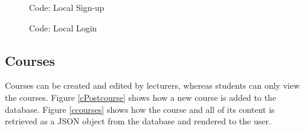 \documentclass[a4paper,12pt]{article}
\numberwithin{equation}{section} %
\numberwithin{figure}{section}
\begin{document}
\begin{figure}[H]
\centering
{}
\caption{Code: Local Sign-up}
\label{cLocalSignup}
\end{figure}

\begin{figure}[H]
\centering
{}
\caption{Code: Local Login}
\label{cLocallogin}
\end{figure}

\subsection{Courses}
Courses can be created and edited by lecturers, whereas students can only view the courses. Figure \ref{cPostcourse} shows how a new course is added to the database. Figure \ref{ccourses} shows how the course and all of its content is retrieved as a JSON object from the database and rendered to the user.
\end{document}
